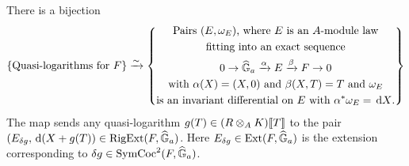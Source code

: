 \documentclass[../main.tex]{subfiles}
\begin{document}
\begin{thm}
  \label{thm:RigExtStr}
  There is a bijection
  \begin{equation}\label{eq:QLogBijection}
    \{\text{Quasi-logarithms for $F$}\} \xrightarrow{\sim} 
      \left\{
      \begin{gathered}
        \text{Pairs $(E, \omega_E)$, where $E$ is an $A$-module law} \\
        \text{fitting into  an exact sequence}
        \\ 0 \to \widehat{\mathbb{G}}_a \xrightarrow{\alpha} E \xrightarrow{\beta} F \to 0 \\
        \text{with $\alpha(X) = (X, 0)$ and $\beta(X, T) = T$ and $\omega_E$} \\
        \text{is an invariant differential on $E$ with 
        $\alpha^* \omega_E = \, \mathrm{d} X$.} \\
      \end{gathered}
      \right\}
  \end{equation}
The map sends any quasi-logarithm $g(T) \in (R\otimes_A K)\llbracket T \rrbracket$
to the pair $(E_{\delta g}, \, \mathrm{d} (X + g(T)) \in \operatorname {RigExt}(F, \widehat{\mathbb{G}}_a)$. Here
$E_{\delta g} \in \operatorname{Ext}(F, \widehat{\mathbb{G}}_a)$ is the extension corresponding to 
$\delta g \in \operatorname{SymCoc}^2(F,\widehat{\mathbb{G}}_a)$. 


\end{thm}
\end{document}
